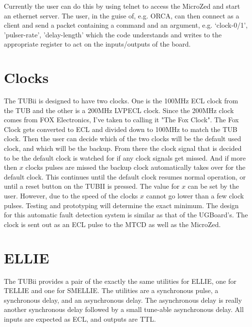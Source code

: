 \documentclass[11pt,a4paper]{article}
\begin{document}
Currently the user can do this by using telnet to access the MicroZed and start an ethernet server. The user, in the guise of, e.g. ORCA, can then connect as a client and send a packet containing a command and an argument, e.g. `clock-0/1', 'pulser-rate', 'delay-length' which the code understands and writes to the appropriate register to act on the inputs/outputs of the board.

\section{Clocks}
The TUBii is designed to have two clocks. One is the 100MHz ECL clock from the TUB and the other is a 200MHz LVPECL clock. Since the 200MHz clock comes from FOX Electronics, I've taken to calling it "The Fox Clock". The Fox Clock gets converted to ECL and divided down to 100MHz to match the TUB clock. Then the user can decide which of the two clocks will be the default used clock, and which will be the backup. From there the clock signal that is decided to be the default clock is watched for if any clock signals get missed. And if more then $x$ clocks pulses are missed the backup clock automatically takes over for the default clock. This continues until the default clock resumes normal operation, or until a reset button on the TUBII is pressed. The value for $x$ can be set by the user. However, due to the speed of the clocks $x$ cannot go lower than a few clock pulses. Testing and prototyping will determine the exact minimum. The design for this automatic fault detection system is similar as that of the UGBoard's. The clock is sent out as an ECL pulse to the MTCD as well as the MicroZed.
\section{ELLIE}
The TUBii provides a pair of the exactly the same utilities for ELLIE, one for TELLIE and one for SMELLIE.
The utilities are a synchronous pulse, a synchronous delay, and an asynchronous delay.    The asynchronous delay is really another synchronous delay followed by a small tune-able asynchronous delay. All inputs are expected as ECL, and outputs are TTL.
\end{document}
